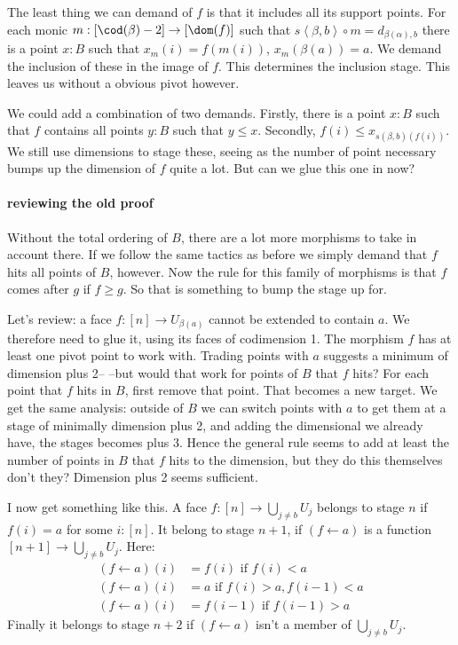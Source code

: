 \documentclass{tac}
\newcommand\of{:}
\newcommand\tuplet[1]{\left\langle #1 \right\rangle}
\begin{document}
The least thing we can demand of $f$ is that it includes all its support points. For each monic $m\of[\cod(\beta) - 2]\to [\dom(f)]$ such that $s\tuplet{\beta,b}\circ m = d_{\beta(\alpha), b}$ there is a point $x\of B$ such that $x_m(i) = f(m(i))$, $x_m(\beta(a)) = a$. We demand the inclusion of these in the image of $f$. This determines the inclusion stage.
This leaves us without a obvious pivot however.

We could add a combination of two demands. Firstly, there is a point $x\of B$ such that $f$ contains all points $y\of B$ such that $y\leq x$.
Secondly, $f(i) \leq x_{s(\beta,b)(f(i))}$. We still use dimensions to stage these, seeing as the number of point necessary bumps up the dimension of $f$ quite a lot. But can we glue this one in now?
 
\paragraph{reviewing the old proof}
Without the total ordering of $B$, there are a lot more morphisms to take in account there. If we follow the same tactics as before we simply demand that $f$ hits all points of $B$, however.
Now the rule for this family of morphisms is that $f$ comes after $g$ if $f\geq g$. So that is something to bump the stage up for.

Let's review: a face $f\of [n]\to U_{\beta(a)}$ cannot be extended to contain $a$. We therefore need to glue it, using its faces of codimension 1. The morphism $f$ has at least one pivot point to work with. Trading points with $a$ suggests a minimum of dimension plus 2-- --but would that work for points of $B$ that $f$ hits?
For each point that $f$ hits in $B$, first remove that point. That becomes a new target. We get the same analysis: outside of $B$ we can switch points with $a$ to get them at a stage of minimally dimension plus 2, and adding the dimensional we already have, the stages becomes plus 3. Hence the general rule seems to add at least the number of points in $B$ that $f$ hits to the dimension, but they do this themselves don't they? Dimension plus 2 seems sufficient.

I now get something like this. A face $f\of [n] \to \bigcup_{j\neq b}U_j$ belongs to stage $n$ if $f(i) = a$ for some $i\of [n]$. It belong to stage $n + 1$, if $(f \leftarrow a)$ is a function $[n + 1] \to \bigcup_{j\neq b}U_j$. Here:
\begin{align*}
(f \mathop\leftarrow a) (i) &= f(i) \textrm{ if } f(i) < a\\
(f \mathop\leftarrow a) (i) &= a \textrm{ if } f(i) > a, f(i - 1) < a \\
(f \mathop\leftarrow a) (i) &= f(i - 1) \textrm{ if } f(i - 1) > a
\end{align*}
Finally it belongs to stage $n + 2$ if $(f \leftarrow a)$ isn't a member of $\bigcup_{j\neq b}U_j$.
\end{document}
